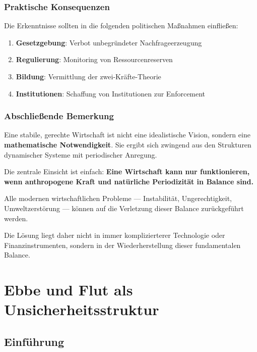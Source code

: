 \documentclass[a4paper, 12pt, twoside, openright]{report}
\theoremstyle{definition}
\theoremstyle{definition}
\begin{document}
\subsection{Praktische Konsequenzen}

Die Erkenntnisse sollten in die folgenden politischen Maßnahmen einfließen:

\begin{enumerate}
    \item \textbf{Gesetzgebung}: Verbot unbegründeter Nachfrageerzeugung
    \item \textbf{Regulierung}: Monitoring von Ressourcenreserven
    \item \textbf{Bildung}: Vermittlung der zwei-Kräfte-Theorie
    \item \textbf{Institutionen}: Schaffung von Institutionen zur Enforcement
\end{enumerate}

\subsection{Abschließende Bemerkung}

Eine stabile, gerechte Wirtschaft ist nicht eine idealistische Vision, sondern eine \textbf{mathematische Notwendigkeit}. Sie ergibt sich zwingend aus den Strukturen dynamischer Systeme mit periodischer Anregung.

Die zentrale Einsicht ist einfach: \textbf{Eine Wirtschaft kann nur funktionieren, wenn anthropogene Kraft und natürliche Periodizität in Balance sind.}

Alle modernen wirtschaftlichen Probleme --- Instabilität, Ungerechtigkeit, Umweltzerstörung --- können auf die Verletzung dieser Balance zurückgeführt werden.

Die Lösung liegt daher nicht in immer komplizierterer Technologie oder Finanzinstrumenten, sondern in der Wiederherstellung dieser fundamentalen Balance.

\cleardoublepage

\chapter{Ebbe und Flut als Unsicherheitsstruktur}
\label{ch:tidal-uncertainty}

\section{Einführung}
\end{document}
